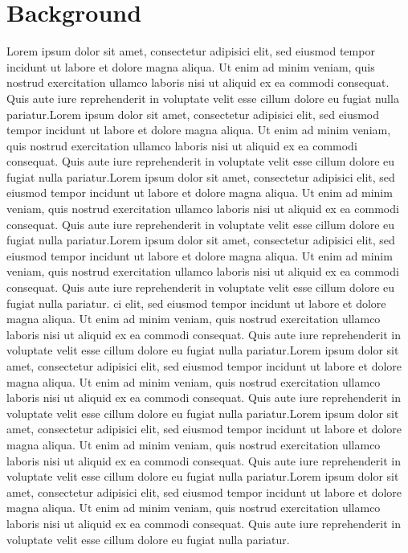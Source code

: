 \chead{}
\chapter{Background}


Lorem ipsum dolor sit amet, consectetur adipisici elit, sed eiusmod tempor incidunt ut labore et dolore magna aliqua. Ut enim ad minim veniam, quis nostrud exercitation ullamco laboris nisi ut aliquid ex ea commodi consequat. Quis aute iure reprehenderit in voluptate velit esse cillum dolore eu fugiat nulla pariatur.Lorem ipsum dolor sit amet, consectetur adipisici elit, sed eiusmod tempor incidunt ut labore et dolore magna aliqua. Ut enim ad minim veniam, quis nostrud exercitation ullamco laboris nisi ut aliquid ex ea commodi consequat. Quis aute iure reprehenderit in voluptate velit esse cillum dolore eu fugiat nulla pariatur.Lorem ipsum dolor sit amet, consectetur adipisici elit, sed eiusmod tempor incidunt ut labore et dolore magna aliqua. Ut enim ad minim veniam, quis nostrud exercitation ullamco laboris nisi ut aliquid ex ea commodi consequat. Quis aute iure reprehenderit in voluptate velit esse cillum dolore eu fugiat nulla pariatur.Lorem ipsum dolor sit amet, consectetur adipisici elit, sed eiusmod tempor incidunt ut labore et dolore magna aliqua. Ut enim ad minim veniam, quis nostrud exercitation ullamco laboris nisi ut aliquid ex ea commodi consequat. Quis aute iure reprehenderit in voluptate velit esse cillum dolore eu fugiat nulla pariatur.
ci elit, sed eiusmod tempor incidunt ut labore et dolore magna aliqua. Ut enim ad minim veniam, quis nostrud exercitation ullamco laboris nisi ut aliquid ex ea commodi consequat. Quis aute iure reprehenderit in voluptate velit esse cillum dolore eu fugiat nulla pariatur.Lorem ipsum dolor sit amet, consectetur adipisici elit, sed eiusmod tempor incidunt ut labore et dolore magna aliqua. Ut enim ad minim veniam, quis nostrud exercitation ullamco laboris nisi ut aliquid ex ea commodi consequat. Quis aute iure reprehenderit in voluptate velit esse cillum dolore eu fugiat nulla pariatur.Lorem ipsum dolor sit amet, consectetur adipisici elit, sed eiusmod tempor incidunt ut labore et dolore magna aliqua. Ut enim ad minim veniam, quis nostrud exercitation ullamco laboris nisi ut aliquid ex ea commodi consequat. Quis aute iure reprehenderit in voluptate velit esse cillum dolore eu fugiat nulla pariatur.Lorem ipsum dolor sit amet, consectetur adipisici elit, sed eiusmod tempor incidunt ut labore et dolore magna aliqua. Ut enim ad minim veniam, quis nostrud exercitation ullamco laboris nisi ut aliquid ex ea commodi consequat. Quis aute iure reprehenderit in voluptate velit esse cillum dolore eu fugiat nulla pariatur.


